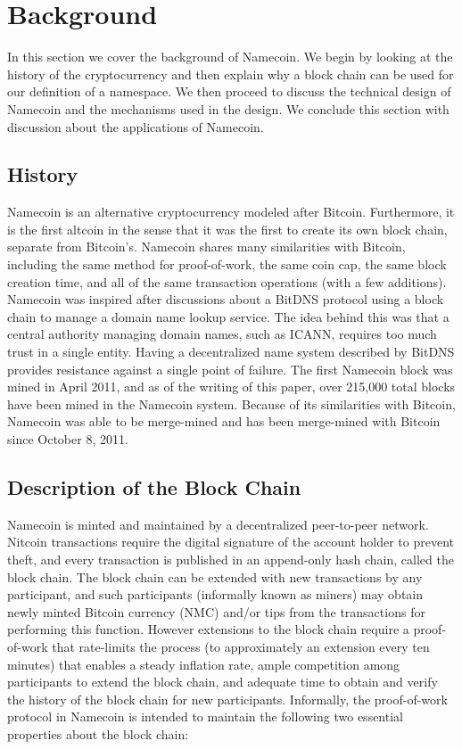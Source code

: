 \section{Background}
\label{sec:background}

In this section we cover the background of Namecoin. We begin by looking at the history of the cryptocurrency and then explain why a block chain can be used for our definition of a namespace. We then proceed to discuss the technical design of Namecoin and the mechanisms used in the design. We conclude this section with discussion about the applications of Namecoin.

\subsection{History}

Namecoin is an alternative cryptocurrency modeled after Bitcoin\cite{nakamoto2008bitcoin}. Furthermore, it is the first altcoin in the sense that it was the first to create its own block chain, separate from Bitcoin's.  Namecoin shares many similarities with Bitcoin, including the same method for proof-of-work, the same coin cap, the same block creation time, and all of the same transaction operations (with a few additions). Namecoin was inspired after discussions about a BitDNS\cite{bitdns} protocol using a block chain to manage a domain name lookup service. The idea behind this was that a central authority managing domain names, such as ICANN, requires too much trust in a single entity. Having a decentralized name system described by BitDNS provides resistance against a single point of failure. The first Namecoin block was mined in April 2011, and as of the writing of this paper, over 215,000 total blocks have been mined in the Namecoin system. Because of its similarities with Bitcoin, Namecoin was able to be merge-mined and has been merge-mined with Bitcoin since October 8, 2011. 

\subsection{Description of the Block Chain}
\cite{bonneau2014decentralizing}
Namecoin is minted and maintained by a decentralized peer-to-peer network. Nitcoin transactions require the digital signature of the account holder to prevent theft, and every transaction is published in an append-only hash chain, called the block chain. The block chain can be extended with new transactions by any participant, and such participants (informally known as miners) may obtain newly minted Bitcoin currency (NMC) and/or tips from the transactions for performing this function. However extensions to the block chain require a proof-of-work that rate-limits the process (to approximately an extension every ten minutes) that enables a steady inflation rate, ample competition among participants to extend the block chain, and adequate time to obtain and verify the history of the block chain for new participants. Informally, the proof-of-work protocol in Namecoin is intended to maintain the following two essential properties about the block chain:

